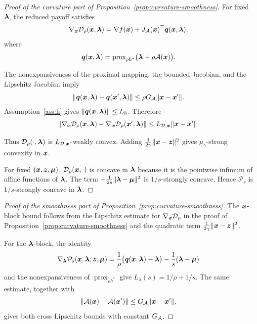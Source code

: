 \begin{proof}[Proof of the curvature part of Proposition~\ref{prop:curvature-smoothness}]
For fixed $\bm{\lambda}$, the reduced payoff satisfies
\[
    \nabla_{\bm{x}}\mathcal D_\rho(\bm{x},\bm{\lambda})
    =
    \nabla f(\bm{x})+J_{\mathcal{A}}(\bm{x})^\top\bm{q}(\bm{x},\bm{\lambda}),
\]
where
\[
    \bm{q}(\bm{x},\bm{\lambda})
    =
    \operatorname{prox}_{\rho h^*}
    \bigl(\bm{\lambda}+\rho\mathcal{A}(\bm{x})\bigr).
\]

The nonexpansiveness of the proximal mapping, the bounded Jacobian, and
the Lipschitz Jacobian imply
\[
    \|\bm{q}(\bm{x},\bm{\lambda})-\bm{q}(\bm{x}',\bm{\lambda})\|
    \le \rho G_{\mathcal{A}}\|\bm{x}-\bm{x}'\|.
\]
Assumption~\ref{ass:h} gives
\(\|\bm{q}(\bm{x},\bm{\lambda})\|\le L_h\).  Therefore
\[
    \|\nabla_{\bm{x}}\mathcal D_\rho(\bm{x},\bm{\lambda})
    -\nabla_{\bm{x}}\mathcal D_\rho(\bm{x}',\bm{\lambda})\|
    \le L_{\mathcal{D},\bm{x}}\|\bm{x}-\bm{x}'\|.
\]

Thus $\mathcal D_\rho(\cdot,\bm{\lambda})$ is
$L_{\mathcal{D},\bm{x}}$-weakly convex.  Adding
$\frac{1}{2\gamma}\|\bm{x}-\bm{z}\|^2$ gives
$\mu_\gamma$-strong convexity in $\bm{x}$.

For fixed $(\bm{x},\bm{z},\bm{\mu})$, $\mathcal D_\rho(\bm{x},\cdot)$ is concave in
$\bm{\lambda}$ because it is the pointwise infimum of affine functions of
$\bm{\lambda}$.  The term
$-\frac{1}{2s}\|\bm{\lambda}-\bm{\mu}\|^2$ is $1/s$-strongly concave.  Hence
$\mathcal P_s$ is $1/s$-strongly concave in $\bm{\lambda}$.
\end{proof}

\begin{proof}[Proof of the smoothness part of Proposition~\ref{prop:curvature-smoothness}]
The $\bm{x}$-block bound follows from the Lipschitz estimate for
$\nabla_{\bm{x}}\mathcal D_\rho$ in the proof of
Proposition~\ref{prop:curvature-smoothness} and the quadratic term
$\frac{1}{2\gamma}\|\bm{x}-\bm{z}\|^2$.

For the $\bm{\lambda}$-block, the identity
\[
    \nabla_{\bm{\lambda}}\mathcal P_s(\bm{x},\bm{\lambda};\bm{z},\bm{\mu})
    =
    \frac{1}{\rho}
    \bigl(\bm{q}(\bm{x},\bm{\lambda})-\bm{\lambda}\bigr)
    -\frac{1}{s}(\bm{\lambda}-\bm{\mu})
\]
and the nonexpansiveness of
$\operatorname{prox}_{\rho h^*}$ give
$L_\lambda(s)=1/\rho+1/s$.
The same estimate, together with
\[
    \|\mathcal{A}(\bm{x})-\mathcal{A}(\bm{x}')\|
    \le G_{\mathcal{A}}\|\bm{x}-\bm{x}'\|,
\]
gives both cross Lipschitz bounds with constant $G_{\mathcal{A}}$.
\end{proof}

